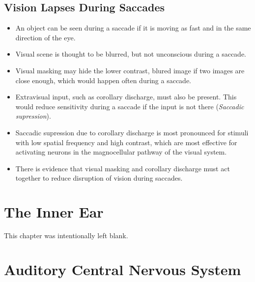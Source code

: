 \documentclass[12pt,a4paper]{article}
\begin{document}
\subsection{Vision Lapses During Saccades}
\begin{itemize}
    \item An object can be seen during a saccade if it is moving as fast and in the same direction of the eye.
    \item Visual scene is thought to be blurred, but not unconscious during a saccade.
    \item Visual masking may hide the lower contrast, blured image if two images are close enough, which would happen often during a saccade.
    \item Extravisual input, such as corollary discharge, must also be present. This would reduce sensitivity during a saccade if the input is not there (\textit{Saccadic supression}).
    \item Saccadic supression due to corollary discharge is most pronounced for stimuli with low spatial frequency and high contrast, which are most effective for activating neurons in the magnocellular pathway of the visual system. 
    \item There is evidence that visual masking and corollary discharge must act together to reduce disruption of vision during saccades.
\end{itemize}

\clearpage
\section{The Inner Ear}
\begin{center}
    This chapter was intentionally left blank. 
\end{center}

\clearpage
\section{Auditory Central Nervous System}
\end{document}
